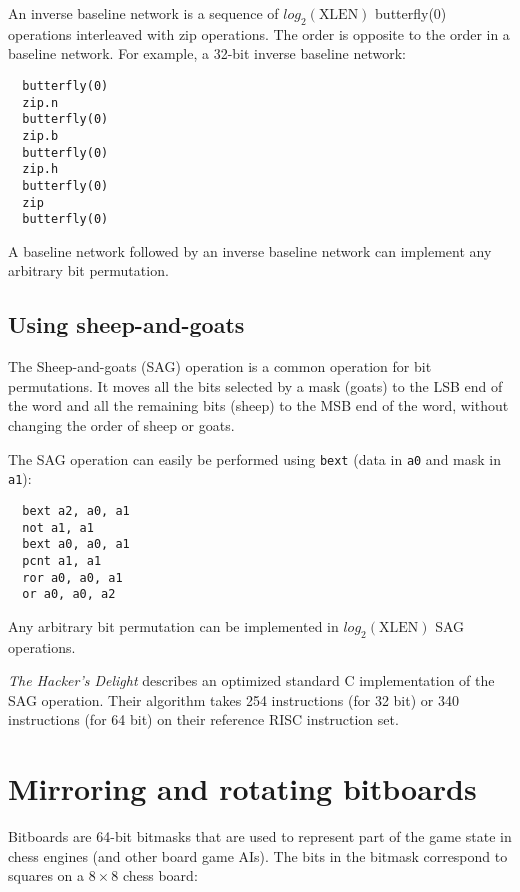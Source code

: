 An inverse baseline network is a sequence of $log_2(\textrm{XLEN})$ butterfly(0)
operations interleaved with zip operations. The order is opposite to the
order in a baseline network. For example, a 32-bit inverse baseline network:

\begin{verbatim}
  butterfly(0)
  zip.n
  butterfly(0)
  zip.b
  butterfly(0)
  zip.h
  butterfly(0)
  zip
  butterfly(0)
\end{verbatim}

A baseline network followed by an inverse baseline network can implement
any arbitrary bit permutation.


\subsection{Using sheep-and-goats}

The Sheep-and-goats (SAG) operation is a common operation for bit permutations.
It moves all the bits selected by a mask (goats) to the LSB end of the word
and all the remaining bits (sheep) to the MSB end of the word, without changing
the order of sheep or goats.

The SAG operation can easily be performed using {\tt bext} (data in {\tt a0} and
mask in {\tt a1}):

\begin{verbatim}
  bext a2, a0, a1
  not a1, a1
  bext a0, a0, a1
  pcnt a1, a1
  ror a0, a0, a1
  or a0, a0, a2
\end{verbatim}

Any arbitrary bit permutation can be implemented in $log_2(\textrm{XLEN})$ SAG
operations.

{\it The Hacker's Delight} describes an optimized standard C implementation of
the SAG operation. Their algorithm takes 254 instructions (for 32 bit) or 340
instructions (for 64 bit) on their reference RISC instruction
set.~\cite[p.~152f,~162f]{Seander05}



\section{Mirroring and rotating bitboards}

Bitboards are 64-bit bitmasks that are used to represent part of the game state
in chess engines (and other board game AIs). The bits in the bitmask correspond
to squares on a $8 \times 8$ chess board:

